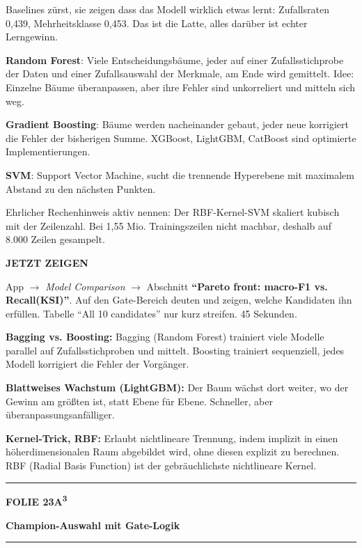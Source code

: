 \documentclass[9pt]{extarticle}
\newcommand{\karte}[3]{%
  \clearpage
  {\color{Accent}\rule{\linewidth}{2.4pt}}\par\vspace{2.5pt}
  {\fontsize{8}{9}\selectfont\bfseries\color{Accent}%
   FOLIE #1\hspace{1.2em}\textbar\hspace{1.2em}#2}\par\vspace{1pt}
  {\fontsize{16}{18}\selectfont\bfseries\color{AccentDark}#3}\par\vspace{3pt}
  {\color{Accent!45}\rule{\linewidth}{0.5pt}}\par\vspace{4pt}%
}
\newcommand{\rubrik}[1]{%
  \vspace{3.5pt}{\fontsize{7.5}{8.5}\selectfont\bfseries\color{Grau}%
  \MakeUppercase{#1}}\par\vspace{1.5pt}}
\newcommand{\zeigen}[1]{%
  \begin{tcolorbox}[enhanced,sharp corners,boxrule=0pt,
    leftrule=2.2pt,colframe=Demo,colback=DemoPale,
    left=5pt,right=5pt,top=3.5pt,bottom=3.5pt,before skip=3pt,after skip=2pt]
    {\fontsize{7.5}{8.5}\selectfont\bfseries\color{Demo}JETZT ZEIGEN}\par\vspace{2pt}
    #1
  \end{tcolorbox}}
\newcommand{\bg}[2]{\item \textbf{#1:} #2}
\begin{document}
\rubrik{Sagen}
\begin{sag}
  \item Baselines zürst, sie zeigen dass das Modell wirklich etwas lernt: Zufallsraten 0,439,
        Mehrheitsklasse 0,453. Das ist die Latte, alles darüber ist echter Lerngewinn.
  \item \textbf{Random Forest}: Viele Entscheidungsbäume, jeder auf einer Zufallsstichprobe der
        Daten und einer Zufallsauswahl der Merkmale, am Ende wird gemittelt. Idee: Einzelne
        Bäume überanpassen, aber ihre Fehler sind unkorreliert und mitteln sich weg.
  \item \textbf{Gradient Boosting}: Bäume werden nacheinander gebaut, jeder neue korrigiert die
        Fehler der bisherigen Summe. XGBoost, LightGBM, CatBoost sind optimierte Implementierungen.
  \item \textbf{SVM}: Support Vector Machine, sucht die trennende Hyperebene mit maximalem Abstand
        zu den nächsten Punkten.
  \item Ehrlicher Rechenhinweis aktiv nennen: Der RBF-Kernel-SVM skaliert kubisch mit der
        Zeilenzahl. Bei 1,55 Mio. Trainingszeilen nicht machbar, deshalb auf 8.000 Zeilen gesampelt.
\end{sag}

\zeigen{App $\rightarrow$ \textit{Model Comparison} $\rightarrow$ Abschnitt
\textbf{\enquote{Pareto front: macro-F1 vs. Recall(KSI)}}. Auf den Gate-Bereich deuten und zeigen,
welche Kandidaten ihn erfüllen. Tabelle \enquote{All 10 candidates} nur kurz streifen. 45 Sekunden.}

\rubrik{Begriffe}
\begin{begriff}
  \bg{Bagging vs. Boosting}{Bagging (Random Forest) trainiert viele Modelle parallel auf
      Zufallsstichproben und mittelt. Boosting trainiert sequenziell, jedes Modell korrigiert
      die Fehler der Vorgänger.}
  \bg{Blattweises Wachstum (LightGBM)}{Der Baum wächst dort weiter, wo der Gewinn am größten
      ist, statt Ebene für Ebene. Schneller, aber überanpassungsanfälliger.}
  \bg{Kernel-Trick, RBF}{Erlaubt nichtlineare Trennung, indem implizit in einen
      höherdimensionalen Raum abgebildet wird, ohne diesen explizit zu berechnen. RBF (Radial
      Basis Function) ist der gebräuchlichste nichtlineare Kernel.}
\end{begriff}

\karte{23}{A\textsuperscript{3}}{Champion-Auswahl mit Gate-Logik}
\end{document}
